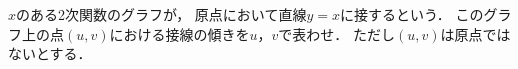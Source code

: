\documentclass[../../main.tex]{subfiles}
\begin{document}
$x$のある2次関数のグラフが，
原点において直線$y=x$に接するという．
このグラフ上の点$(u,v)$における接線の傾きを$u$，$v$で表わせ．
ただし$(u,v)$は原点ではないとする．
\end{document}

